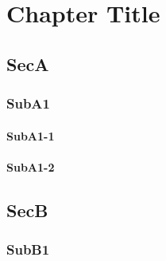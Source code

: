 \chapter{Chapter Title}
\label{chap:}

\lipsum[1]




\section{SecA}
\label{sec:}

\lipsum[1]



\subsection{SubA1}
\label{subsec:}

\lipsum[1]


\subsubsection{SubA1-1}
\label{subsec:}

\lipsum[1]


\subsubsection{SubA1-2}
\label{subsec:}

\lipsum[1]




\section{SecB}
\label{sec:}

\lipsum[1]



\subsection{SubB1}
\label{subsec:}

\lipsum[1]

